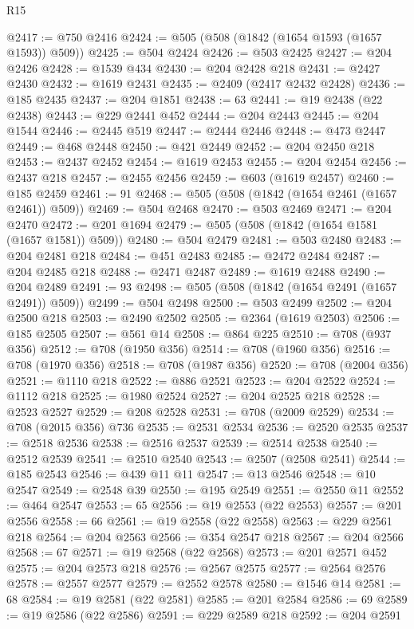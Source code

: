 \begin{lexlean}{R15}
\begin{coremodule}
{{{{{@2417 := @750 @2416
@2424 := @505 (@508 (@1842 (@1654 @1593 (@1657 @1593)) @509))
@2425 := @504 @2424
@2426 := @503 @2425
@2427 := @204 @2426
@2428 := @1539 @434
@2430 := @204 @2428 @218
@2431 := @2427 @2430
@2432 := @1619 @2431
@2435 := @2409 (@2417 @2432 @2428)
@2436 := @185 @2435
@2437 := @204 @1851
@2438 := 63
@2441 := @19 @2438 (@22 @2438)
@2443 := @229 @2441 @452
@2444 := @204 @2443
@2445 := @204 @1544
@2446 := @2445 @519
@2447 := @2444 @2446
@2448 := @473 @2447
@2449 := @468 @2448
@2450 := @421 @2449
@2452 := @204 @2450 @218
@2453 := @2437 @2452
@2454 := @1619 @2453
@2455 := @204 @2454
@2456 := @2437 @218
@2457 := @2455 @2456
@2459 := @603 (@1619 @2457)
@2460 := @185 @2459
@2461 := 91
@2468 := @505 (@508 (@1842 (@1654 @2461 (@1657 @2461)) @509))
@2469 := @504 @2468
@2470 := @503 @2469
@2471 := @204 @2470
@2472 := @201 @1694
@2479 := @505 (@508 (@1842 (@1654 @1581 (@1657 @1581)) @509))
@2480 := @504 @2479
@2481 := @503 @2480
@2483 := @204 @2481 @218
@2484 := @451 @2483
@2485 := @2472 @2484
@2487 := @204 @2485 @218
@2488 := @2471 @2487
@2489 := @1619 @2488
@2490 := @204 @2489
@2491 := 93
@2498 := @505 (@508 (@1842 (@1654 @2491 (@1657 @2491)) @509))
@2499 := @504 @2498
@2500 := @503 @2499
@2502 := @204 @2500 @218
@2503 := @2490 @2502
@2505 := @2364 (@1619 @2503)
@2506 := @185 @2505
@2507 := @561 @14
@2508 := @864 @225
@2510 := @708 (@937 @356)
@2512 := @708 (@1950 @356)
@2514 := @708 (@1960 @356)
@2516 := @708 (@1970 @356)
@2518 := @708 (@1987 @356)
@2520 := @708 (@2004 @356)
@2521 := @1110 @218
@2522 := @886 @2521
@2523 := @204 @2522
@2524 := @1112 @218
@2525 := @1980 @2524
@2527 := @204 @2525 @218
@2528 := @2523 @2527
@2529 := @208 @2528
@2531 := @708 (@2009 @2529)
@2534 := @708 (@2015 @356) @736
@2535 := @2531 @2534
@2536 := @2520 @2535
@2537 := @2518 @2536
@2538 := @2516 @2537
@2539 := @2514 @2538
@2540 := @2512 @2539
@2541 := @2510 @2540
@2543 := @2507 (@2508 @2541)
@2544 := @185 @2543
@2546 := @439 @11 @11
@2547 := @13 @2546
@2548 := @10 @2547
@2549 := @2548 @39
@2550 := @195 @2549
@2551 := @2550 @11
@2552 := @464 @2547
@2553 := 65
@2556 := @19 @2553 (@22 @2553)
@2557 := @201 @2556
@2558 := 66
@2561 := @19 @2558 (@22 @2558)
@2563 := @229 @2561 @218
@2564 := @204 @2563
@2566 := @354 @2547 @218
@2567 := @204 @2566
@2568 := 67
@2571 := @19 @2568 (@22 @2568)
@2573 := @201 @2571 @452
@2575 := @204 @2573 @218
@2576 := @2567 @2575
@2577 := @2564 @2576
@2578 := @2557 @2577
@2579 := @2552 @2578
@2580 := @1546 @14
@2581 := 68
@2584 := @19 @2581 (@22 @2581)
@2585 := @201 @2584
@2586 := 69
@2589 := @19 @2586 (@22 @2586)
@2591 := @229 @2589 @218
@2592 := @204 @2591
}}}}}
\end{coremodule}
\end{lexlean}
